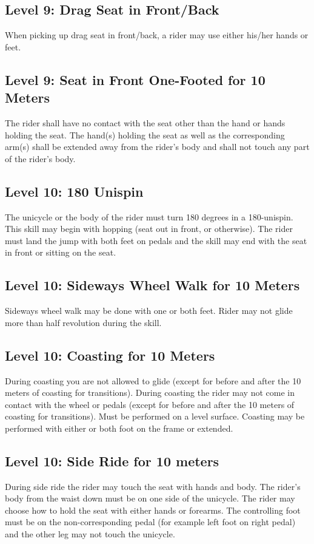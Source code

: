 \subsection{Level 9: Drag Seat in Front/Back}
When picking up drag seat in front/back, a rider may use either his/her hands or feet.

\subsection{Level 9: Seat in Front One-Footed for 10 Meters}
The rider shall have no contact with the seat other than the hand or hands holding the seat.
The hand(s) holding the seat as well as the corresponding arm(s) shall be extended away from the rider's body and shall not touch any part of the rider's body.

\subsection{Level 10: 180 Unispin}
The unicycle or the body of the rider must turn 180 degrees in a 180-unispin.
This skill may begin with hopping (seat out in front, or otherwise).
The rider must land the jump with both feet on pedals and the skill may end with the seat in
front or sitting on the seat.

\subsection{Level 10: Sideways Wheel Walk for 10 Meters}
Sideways wheel walk may be done with one or both feet.
Rider may not glide more than half revolution during the skill.

\subsection{Level 10: Coasting for 10 Meters}
During coasting you are not allowed to glide (except for before and after the 10 meters of coasting for transitions).
During coasting the rider may not come in contact with the wheel or pedals (except for before and after the 10 meters of coasting for transitions).
Must be performed on a level surface.
Coasting may be performed with either or both foot on the frame or extended.

\subsection{Level 10: Side Ride for 10 meters}
During side ride the rider may touch the seat with hands and body.
The rider's body from the waist down must be on one side of the unicycle.
The rider may choose how to hold the seat with either hands or forearms.
The controlling foot must be on the non-corresponding pedal (for example left foot on right pedal) and the other leg may not touch the unicycle.

